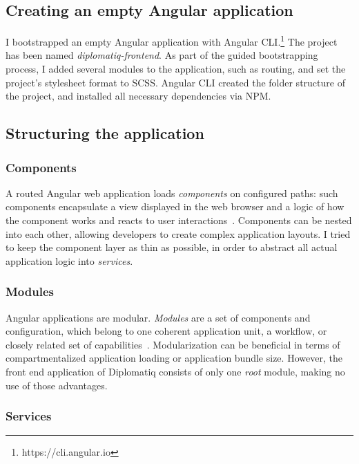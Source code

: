 \subsection{Creating an empty Angular application}

I bootstrapped an empty Angular application with Angular CLI.\footnote{https://cli.angular.io} The project has been named \emph{diplomatiq-frontend}. As part of the guided bootstrapping process, I added several modules to the application, such as routing, and set the project's stylesheet format to SCSS. Angular CLI created the folder structure of the project, and installed all necessary dependencies via NPM.

\subsection{Structuring the application}

\subsubsection{Components}

A routed Angular web application loads \emph{components} on configured paths: such components encapsulate a view displayed in the web browser and a logic of how the component works and reacts to user interactions~\cite{angular-reference-docs}. Components can be nested into each other, allowing developers to create complex application layouts. I tried to keep the component layer as thin as possible, in order to abstract all actual application logic into \emph{services}.

\subsubsection{Modules}

Angular applications are modular. \emph{Modules} are a set of components and configuration, which belong to one coherent application unit, a workflow, or closely related set of capabilities~\cite{angular-reference-docs}. Modularization can be beneficial in terms of compartmentalized application loading or application bundle size. However, the front end application of Diplomatiq consists of only one \emph{root} module, making no use of those advantages.

\subsubsection{Services}

